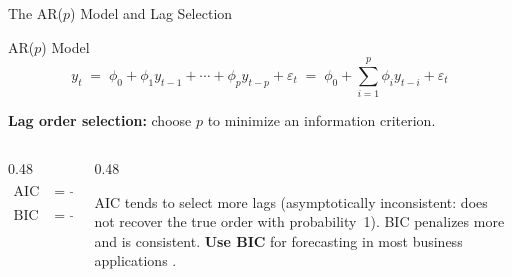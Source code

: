 \documentclass[aspectratio=169, 11pt]{beamer}
\begin{document}
\begin{frame}{The AR($p$) Model and Lag Selection}
  \begin{definitionbox}{AR($p$) Model}
    \[
      y_t \;=\; \phi_0 + \phi_1 y_{t-1} + \cdots + \phi_p y_{t-p} + \varepsilon_t
            \;=\; \phi_0 + \sum_{i=1}^{p} \phi_i y_{t-i} + \varepsilon_t
    \]
  \end{definitionbox}
  \vspace{0.1cm}
  \textbf{Lag order selection:} choose $p$ to minimize an information criterion.

  \vspace{0.1cm}
  \begin{columns}[T]
    \begin{column}{0.48\textwidth}
      \begin{align*}
        \text{AIC} &= -2\hat{\ell} + 2(p+2) \\[4pt]
        \text{BIC} &= -2\hat{\ell} + (p+2)\ln T
      \end{align*}
    \end{column}
    \begin{column}{0.48\textwidth}
      \begin{keybox}
        \small
        AIC tends to select more lags
        (asymptotically inconsistent: does not
        recover the true order with probability~1).
        BIC penalizes more and is consistent.
        \textbf{Use BIC} for forecasting in most
        business applications \parencite[][Ch.~5]{BoxJenkins2015}.
      \end{keybox}
    \end{column}
  \end{columns}
\end{frame}
\end{document}
